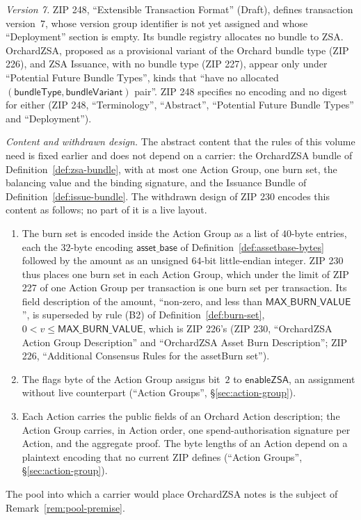 \documentclass[11pt,a4paper]{article}
\theoremstyle{definition}
\begin{document}
\emph{Version 7.} ZIP 248, ``Extensible Transaction Format'' (Draft),
defines transaction version~$7$, whose version group identifier is not yet
assigned and whose ``Deployment'' section is empty. Its bundle registry
allocates no bundle to ZSA. OrchardZSA, proposed as a provisional variant
of the Orchard bundle type (ZIP 226), and ZSA Issuance, with no bundle type
(ZIP 227), appear only under ``Potential Future Bundle Types'', kinds that
``have no allocated $(\mathsf{bundleType}, \mathsf{bundleVariant})$
pair''. ZIP 248 specifies no encoding and no digest for either (ZIP 248,
``Terminology'', ``Abstract'', ``Potential Future Bundle Types'' and
``Deployment'').

\emph{Content and withdrawn design.} The abstract content that the rules of
this volume need is fixed earlier and does not depend on a carrier: the
OrchardZSA bundle of Definition~\ref{def:zsa-bundle}, with at most one
Action Group, one burn set, the balancing value and the binding signature,
and the Issuance Bundle of Definition~\ref{def:issue-bundle}. The withdrawn
design of ZIP 230 encodes this content as follows; no part of it is a live
layout.
\begin{enumerate}[label=(\alph*)]
\item The burn set is encoded inside the Action Group as a list of
  $40$-byte entries, each the $32$-byte encoding $\mathsf{asset\_base}$ of
  Definition~\ref{def:assetbase-bytes} followed by the amount as an
  unsigned $64$-bit little-endian integer. ZIP 230 thus places one burn set
  in each Action Group, which under the limit of ZIP 227 of one Action
  Group per transaction is one burn set per transaction. Its field
  description of the amount, ``non-zero, and less than
  $\mathsf{MAX\_BURN\_VALUE}$'', is superseded by rule (B2) of
  Definition~\ref{def:burn-set}, $0 < v \le \mathsf{MAX\_BURN\_VALUE}$,
  which is ZIP 226's (ZIP 230, ``OrchardZSA Action Group Description''
  and ``OrchardZSA Asset Burn Description''; ZIP 226, ``Additional
  Consensus Rules for the assetBurn set'').
\item The flags byte of the Action Group assigns bit~$2$ to
  $\mathsf{enableZSA}$, an assignment without live counterpart
  (``Action Groups'', \S\ref{sec:action-group}).
\item Each Action carries the public fields of an Orchard Action
  description; the Action Group carries, in Action order, one
  spend-authorisation signature per Action, and the aggregate proof. The
  byte lengths of an Action depend on a plaintext encoding that no current
  ZIP defines (``Action Groups'', \S\ref{sec:action-group}).
\end{enumerate}
The pool into which a carrier would place OrchardZSA notes is the subject
of Remark~\ref{rem:pool-premise}.
\end{document}
